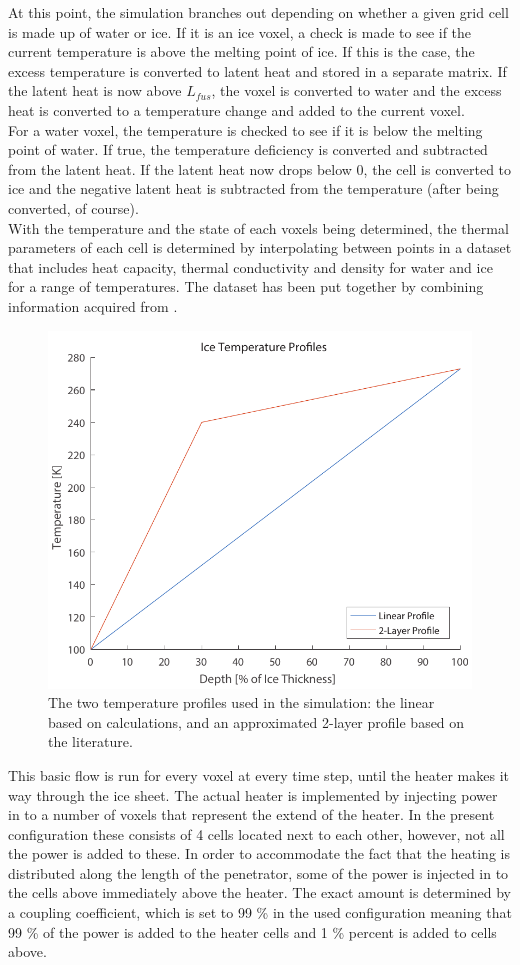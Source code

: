 \noindent
At this point, the simulation branches out depending on whether a given grid cell is made up of water or ice. If it is an ice voxel, a check is made to see if the current temperature is above the melting point of ice. If this is the case, the excess temperature is converted to latent heat and stored in a separate matrix. If the latent heat is now above $L_{fus}$, the voxel is converted to water and the excess heat is converted to a temperature change and added to the current voxel.\\

\noindent
For a water voxel, the temperature is checked to see if it is below the melting point of water. If true, the temperature deficiency is converted and subtracted from the latent heat. If the latent heat now drops below 0, the cell is converted to ice and the negative latent heat is subtracted from the temperature (after being converted, of course).\\

\noindent
With the temperature and the state of each voxels being determined, the thermal parameters of each cell is determined by interpolating between points in a dataset that includes heat capacity, thermal conductivity and density for water and ice for a range of temperatures. The dataset has been put together by combining information acquired from \cite{website:engineeringToolbox}.\\

\begin{figure}[ht]
	\centering
	\includegraphics[width=.5\textwidth]{figures/LAMC/iceTempProfiles.pdf}
	\caption{The two temperature profiles used in the simulation: the linear based on calculations, and an approximated 2-layer profile based on the literature.}
	\label{fig:iceTempProfiles}
\end{figure}

\noindent
This basic flow is run for every voxel at every time step, until the heater makes it way through the ice sheet. The actual heater is implemented by injecting power in to a number of voxels that represent the extend of the heater. In the present configuration these consists of 4 cells located next to each other, however, not all the power is added to these. In order to accommodate the fact that the heating is distributed along the length of the penetrator, some of the power is injected in to the cells above immediately above the heater. The exact amount is determined by a coupling coefficient, which is set to 99 \% in the used configuration meaning that 99 \% of the power is added to the heater cells and 1 \% percent is added to cells above. \\

